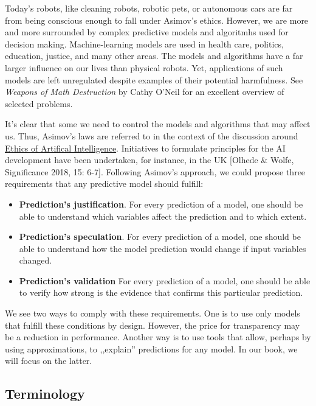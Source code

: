 \documentclass[12pt,]{krantz}
\providecommand{\tightlist}{%
  \setlength{\itemsep}{0pt}\setlength{\parskip}{0pt}}
\theoremstyle{definition}
\theoremstyle{definition}
\theoremstyle{definition}
\theoremstyle{remark}
\begin{document}
Today's robots, like cleaning robots, robotic pets, or autonomous cars
are far from being conscious enough to fall under Asimov's ethics.
However, we are more and more surrounded by complex predictive models
and algoritmhs used for decision making. Machine-learning models are
used in health care, politics, education, justice, and many other areas.
The models and algorithms have a far larger influence on our lives than
physical robots. Yet, applications of such models are left unregulated
despite examples of their potential harmfulness. See \emph{Weapons of
Math Destruction} by Cathy O'Neil \citep{ONeil} for an excellent
overview of selected problems.

It's clear that some we need to control the models and algorithms that
may affect us. Thus, Asimov's laws are referred to in the context of the
discussion around
\href{https://en.wikipedia.org/wiki/Ethics_of_artificial_intelligence}{Ethics
of Artifical Intelligence}. Initiatives to formulate principles for the
AI development have been undertaken, for instance, in the UK {[}Olhede
\& Wolfe, Significance 2018, 15: 6-7{]}. Following Asimov's approach, we
could propose three requirements that any predictive model should
fulfill:

\begin{itemize}
\tightlist
\item
  \textbf{Prediction's justification}. For every prediction of a model,
  one should be able to understand which variables affect the prediction
  and to which extent.
\item
  \textbf{Prediction's speculation}. For every prediction of a model,
  one should be able to understand how the model prediction would change
  if input variables changed.
\item
  \textbf{Prediction's validation} For every prediction of a model, one
  should be able to verify how strong is the evidence that confirms this
  particular prediction.
\end{itemize}

We see two ways to comply with these requirements. One is to use only
models that fulfill these conditions by design. However, the price for
transparency may be a reduction in performance. Another way is to use
tools that allow, perhaps by using approximations, to ,,explain''
predictions for any model. In our book, we will focus on the latter.

\hypertarget{terminology}{%
\subsection{Terminology}\label{terminology}}
\end{document}
